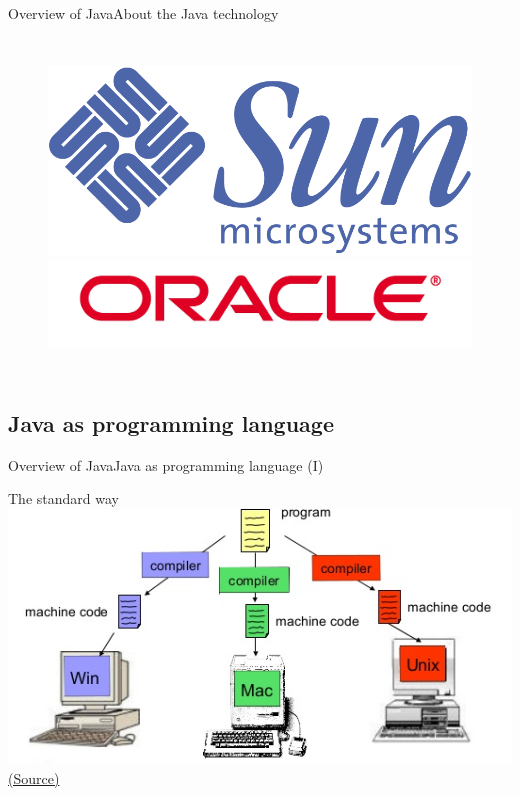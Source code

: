\documentclass{beamer}
\begin{document}
\begin{frame}{Overview of Java}{About the Java technology}
\begin{columns}
\begin{figure}[t]
\begin{center}
			\bigskip
		    \includegraphics[width=0.6\linewidth]{figs/Sun}\\
			\bigskip
		    \includegraphics[width=0.6\linewidth]{figs/oracle}
		\end{center}
   	 	\end{figure}
    \end{columns}

\end{frame}

\subsection[Java as programming language]{Java as programming language}
\begin{frame}{Overview of Java}{Java as programming language (I)}
	\begin{center}
	The standard way\\
	\bigskip
	\includegraphics[width=0.8\linewidth]{figs/compilacion}\\
	\scriptsize{\href{http://es.slideshare.net/darokoblog/an-introduction-to-java-programming-language-forbeginnersjava-programming-tutorials}{(Source)}}
	\end{center}
\end{frame}
\end{document}
